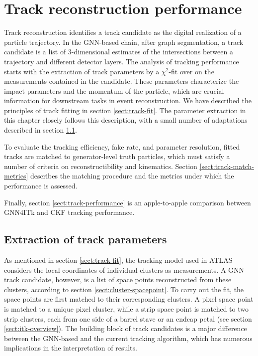 \chapter{Track reconstruction performance}
\label{chap:tracking-performance}
Track reconstruction identifies a track candidate as the digital realization of a particle trajectory. 
In the GNN-based chain, after graph segmentation, a track candidate is a list of 3-dimensional estimates of the intersections between a trajectory and different detector layers. 
The analysis of tracking performance starts with the extraction of track parameters by a $\chi^2$-fit over on the measurements contained in the candidate.
These parameters characterize the impact parameters and the momentum of the particle, which are crucial information for downstream tasks in event reconstruction. 
We have described the principles of track fitting in section \ref{sect:track-fit}.
The parameter extraction in this chapter closely follows this description, with a small number of adaptations described in section \ref{sect:chi2-fit}.

To evaluate the tracking efficiency, fake rate, and parameter resolution, fitted tracks are matched to generator-level truth particles, which must satisfy a number of criteria on reconstructibility and kinematics.
Section \ref{sect:track-match-metrics} describes the matching procedure and the metrics under which the performance is assessed.

Finally, section \ref{sect:track-performance} is an apple-to-apple comparison between GNN4ITk and CKF tracking performance.



\section{Extraction of track parameters}
\label{sect:chi2-fit}

As mentioned in section \ref{sect:track-fit}, the tracking model used in ATLAS considers the local coordinates of individual clusters as measurements.
A GNN track candidate, however, is a list of space points reconstructed from these clusters, according to section \ref{sect:cluster-spacepoint}. 
To carry out the fit, the space points are first matched to their corresponding clusters. 
A pixel space point is matched to a unique pixel cluster, while a strip space point is matched to two strip clusters, each from one side of a barrel stave or an endcap petal (see section \ref{sect:itk-overview}). 
The building block of track candidates is a major difference between the GNN-based and the current tracking algorithm, which has numerous implications in the interpretation of results.

